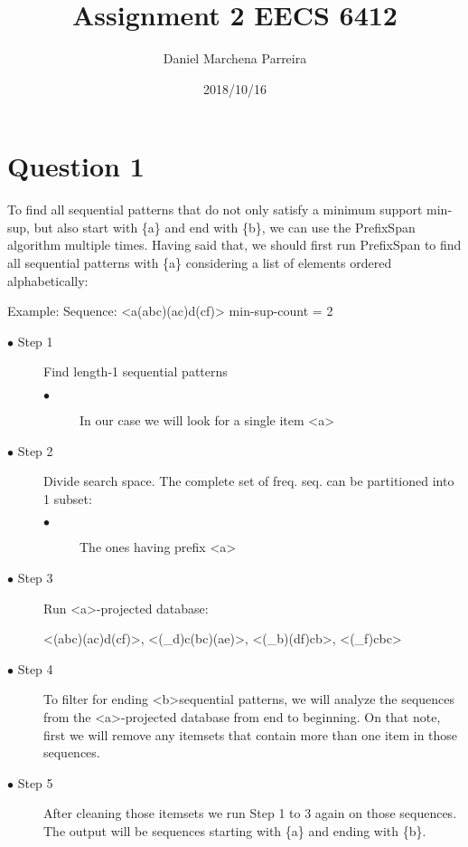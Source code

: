 \documentclass[a4paper]{article}
\title{Assignment 2 EECS 6412}
\author{Daniel Marchena Parreira}
\date{2018/10/16}
\begin{document}
\maketitle

\section*{Question 1}

To find all sequential patterns that do not only satisfy a minimum support min-sup, but also start with \{a\} and end with \{b\}, we can use the PrefixSpan algorithm multiple times. Having said that, we should first run PrefixSpan to find all sequential patterns with \{a\} considering a list of elements ordered alphabetically:

Example:
\newline
Sequence: \textless a(abc)(ac)d(cf)\textgreater
\newline
min-sup-count = 2
\newline

\begin{description}
    \item[$\bullet$ Step 1] Find length-1 sequential patterns
    \begin{outline}
      \begin{description}
        \item[$\bullet$] In our case we will look for a single item \textless a\textgreater
      \end{description}
    \end{outline}

    \item[$\bullet$ Step 2] Divide search space. The complete set of freq. seq. can be partitioned into 1 subset:
    \begin{outline}
      \begin{description}
        \item[$\bullet$] The ones having prefix \textless a\textgreater
      \end{description}
    \end{outline}

    \item[$\bullet$ Step 3] Run \textless a\textgreater-projected database:

    \textless (abc)(ac)d(cf)\textgreater,
    \textless (\_d)c(bc)(ae)\textgreater,
    \textless (\_b)(df)cb\textgreater,
    \textless (\_f)cbc\textgreater

    \item[$\bullet$ Step 4] To filter for ending \textless b\textgreater sequential patterns, we will analyze the sequences from the \textless a\textgreater-projected database from end to beginning. On that note, first we will remove any itemsets that contain more than one item in those sequences.

    \item[$\bullet$ Step 5] After cleaning those itemsets we run Step 1 to 3 again on those sequences. The output will be sequences starting with \{a\} and ending with \{b\}.

\end{description}
\end{document}
